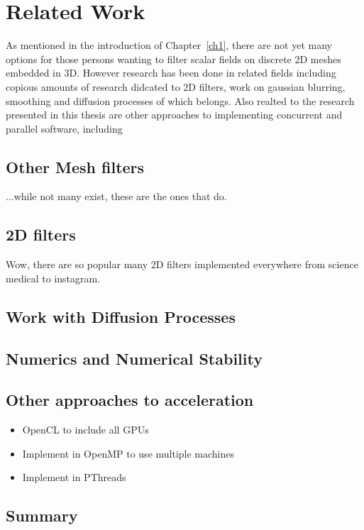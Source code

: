 \chapter{Related Work}
As mentioned in the introduction of Chapter~\ref{ch1}, there are not yet many options for those persons wanting to filter scalar fields on discrete 2D meshes embedded in 3D. However research has been done in related fields including copious amounts of research didcated to 2D filters, work on gaussian blurring, smoothing and diffusion processes of which  belongs. Also realted to the research presented in this thesis are other approaches to implementing concurrent and parallel software, including

%
%
%
%
\section{Other Mesh filters}
...while not many exist, these are the ones that do.

%
%
%
%
\section{2D filters}
Wow, there are so popular many 2D filters implemented everywhere from science medical to instagram.

%
%
%
%
\section{Work with Diffusion Processes}

%
%
%
%
\section{Numerics and Numerical Stability}

%
%
%
%
\section{Other approaches to acceleration}
\begin{itemize}
	\item OpenCL to include all GPUs
	\item Implement in OpenMP to use multiple machines
	\item Implement in PThreads
\end{itemize}

%
%
%
%
\section{Summary}
%
